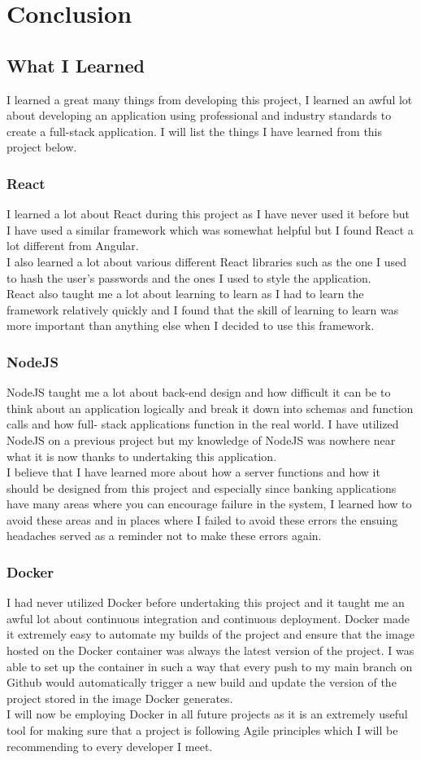 \chapter{Conclusion}
\section{What I Learned}
I learned a great many things from developing this project, I learned an awful lot about developing an application using professional and industry standards to create a full-stack application.  I will list the things I have learned from this project below.
\subsection{React}
I learned a lot about React during this project as I have never used it before but I
have used a similar framework which was somewhat helpful but I found React a lot different
from Angular.
\\
I also learned a lot about various different React libraries such as the one I used to
hash the user's passwords and the ones I used to style the application.
\\
React also taught me a lot about learning to learn as I had to learn the framework
relatively quickly and I found that the skill of learning to learn was more important
than anything else when I decided to use this framework.
\subsection{NodeJS}
NodeJS taught me a lot about back-end design and how difficult it can be to think about
an application logically and break it down into schemas and function calls and how full-
stack applications function in the real world.  I have utilized NodeJS on a previous project
but my knowledge of NodeJS was nowhere near what it is now thanks to undertaking this application.
\\
I believe that I have learned more about how a server functions and how it should be designed from this
project and especially since banking applications have many areas where you can encourage failure in the
system, I learned how to avoid these areas and in places where I failed to avoid these errors the ensuing
headaches served as a reminder not to make these errors again.
\subsection{Docker}
I had never utilized Docker before undertaking this project and it taught me an
awful lot about continuous integration and continuous deployment.  Docker made it
extremely easy to automate my builds of the project and ensure that the image hosted
on the Docker container was always the latest version of the project.  I was able to
set up the container in such a way that every push to my main branch on Github would
automatically trigger a new build and update the version of the project stored in the
image Docker generates.
\\
I will now be employing Docker in all future projects as it is an extremely useful tool
for making sure that a project is following Agile principles
which I will be recommending to every developer I meet.

